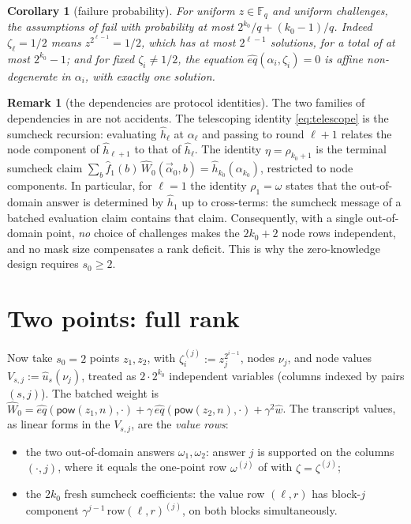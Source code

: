 \documentclass{article}
\newcommand{\Fq}{\mathbb{F}_q}
\newcommand{\pow}{\mathsf{pow}}
\newtheorem{corollary}{Corollary}
\theoremstyle{definition}
\newtheorem{remark}{Remark}
\begin{document}
\begin{corollary}[failure probability]\label{cor:rankprob}
For uniform $z \in \Fq$ and uniform challenges, the assumptions of  fail with probability at most $2^{k_0}/q + (k_0 - 1)/q$. Indeed $\zeta_\ell = 1/2$ means $z^{2^{\ell - 1}} = 1/2$, which has at most $2^{\ell-1}$ solutions, for a total of at most $2^{k_0} - 1$; and for fixed $\zeta_i \neq 1/2$, the equation $\hat{eq}(\alpha_i, \zeta_i) = 0$ is affine non-degenerate in $\alpha_i$, with exactly one solution.
\end{corollary}

\begin{remark}[the dependencies are protocol identities]\label{rem:identities}
The two families of dependencies in  are not accidents. The telescoping identity \cref{eq:telescope} is the sumcheck recursion: evaluating $\hat{h}_\ell$ at $\alpha_\ell$ and passing to round $\ell + 1$ relates the node component of $\hat{h}_{\ell+1}$ to that of $\hat{h}_\ell$. The identity $\eta = \rho_{k_0 + 1}$ is the terminal sumcheck claim $\sum_b \hat{f}_1(b)\, \hat{W}_0(\vec{\alpha}_0, b) = \hat{h}_{k_0}(\alpha_{k_0})$, restricted to node components. In particular, for $\ell = 1$ the identity $\rho_1 = \omega$ states that the out-of-domain answer is determined by $\hat{h}_1$ up to cross-terms: the sumcheck message of a batched evaluation claim contains that claim. Consequently, with a single out-of-domain point, \emph{no} choice of challenges makes the $2k_0 + 2$ node rows independent, and no mask size compensates a rank deficit. This is why the zero-knowledge design requires $s_0 \geq 2$.
\end{remark}

\section{Two points: full rank}\label{sec:twopoint}

Now take $s_0 = 2$ points $z_1, z_2$, with $\zeta^{(j)}_i := z_j^{2^{i-1}}$, nodes $\nu_j$, and node values $V_{s,j} := \hat{u}_s(\nu_j)$, treated as $2 \cdot 2^{k_0}$ independent variables (columns indexed by pairs $(s, j)$). The batched weight is $\hat{W}_0 = \hat{eq}(\pow(z_1, n), \cdot) + \gamma\, \hat{eq}(\pow(z_2, n), \cdot) + \gamma^2 \hat{w}$. The transcript values, as linear forms in the $V_{s,j}$, are the \emph{value rows}:
\begin{itemize}
    \item the two out-of-domain answers $\omega_1, \omega_2$: answer $j$ is supported on the columns $(\cdot, j)$, where it equals the one-point row $\omega^{(j)}$ of  with $\zeta = \zeta^{(j)}$;
    \item the $2k_0$ fresh sumcheck coefficients: the value row $(\ell, r)$ has block-$j$ component $\gamma^{j-1}\, \mathrm{row}(\ell, r)^{(j)}$, on both blocks simultaneously.
\end{itemize}
\end{document}
